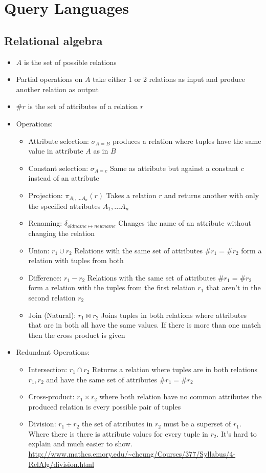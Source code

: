 \documentclass[10pt,a4paper]{article}
\begin{document}
\section{Query Languages}
	\subsection{Relational algebra}
		\begin{itemize}
			\item $A$ is the set of possible relations
			\item Partial operations on $A$ take either 1 or 2 relations as input and produce another relation as output
			\item $\#r$ is the set of attributes of a relation $r$
			\item Operations:
			\begin{itemize}
				\item Attribute selection: $\sigma_{A=B}$ produces a relation where tuples have the same value in attribute $A$ as in $B$
				\item Constant selection: $\sigma_{A=c}$ Same as attribute but against a constant $c$ instead of an attribute
				\item Projection: $\pi_{A_1,...A_n}(r)$ Takes a relation $r$ and returns another with only the specified attributes $A_1,...A_n$
				\item Renaming: $\delta_{oldname\mapsto newname}$ Changes the name of an attribute without changing the relation
				\item Union: $r_1\cup r_2$ Relations with the same set of attributes $\#r_1 = \#r_2$ form a relation with tuples from both
				\item Difference: $r_1 - r_2$ Relations with the same set of attributes $\#r_1 = \#r_2$ form a relation with the tuples from the first relation $r_1$ that aren't in the second relation $r_2$
				\item Join (Natural): $r_1 \bowtie r_2$ Joins tuples in both relations where attributes that are in both all have the same values. If there is more than one match then the cross product is given
			\end{itemize}
			\item Redundant Operations:
			\begin{itemize}
				\item Intersection: $r_1\cap r_2$ Returns a relation where tuples are in both relations $r_1, r_2$ and have the same set of attributes $\#r_1 = \#r_2$
				\item Cross-product: $r_1\times r_2$ where both relation have no common attributes the produced relation is every possible pair of tuples
				\item Division: $r_1\div r_2$ the set of attributes in $r_2$ must be a superset of $r_1$. Where there is there is attribute values for every tuple in $r_2$. It's hard to explain and much easier to show. \url{http://www.mathcs.emory.edu/~cheung/Courses/377/Syllabus/4-RelAlg/division.html}
			\end{itemize}
		\end{itemize}
\end{document}
